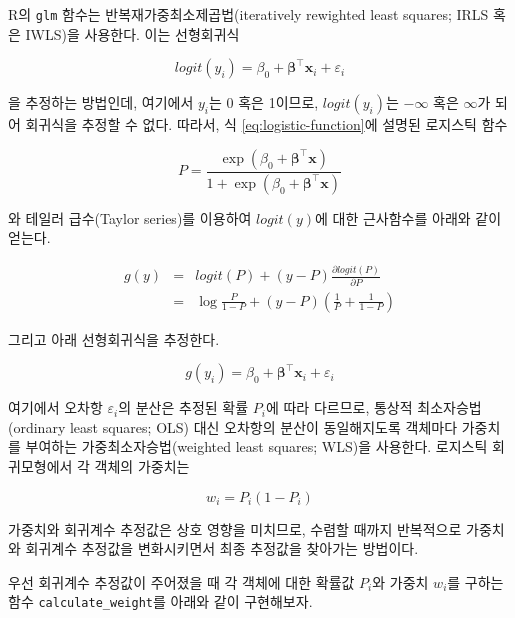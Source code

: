 \documentclass[]{book}
\begin{document}
R의 \texttt{glm} 함수는 반복재가중최소제곱법(iteratively rewighted least squares; IRLS 혹은 IWLS)을 사용한다. 이는 선형회귀식

\begin{equation*}
logit(y_i) = \beta_0 + \boldsymbol\beta^\top \mathbf{x}_i + \varepsilon_i
\end{equation*}

을 추정하는 방법인데, 여기에서 \(y_i\)는 0 혹은 1이므로, \(logit(y_i)\)는 \(-\infty\) 혹은 \(\infty\)가 되어 회귀식을 추정할 수 없다. 따라서, 식 \eqref{eq:logistic-function}에 설명된 로지스틱 함수

\begin{equation*}
P = \frac{\exp(\beta_0 + \boldsymbol\beta^\top \mathbf{x})}{1 + \exp(\beta_0 + \boldsymbol\beta^\top \mathbf{x})}
\end{equation*}

와 테일러 급수(Taylor series)를 이용하여 \(logit(y)\)에 대한 근사함수를 아래와 같이 얻는다.

\begin{eqnarray*}
g(y) &=& logit(P) + (y - P) \frac{\partial logit(P)}{\partial P}\\
&=& \log \frac{P}{1 - P} + (y - P) \left( \frac{1}{P} + \frac{1}{1 - P} \right)
\end{eqnarray*}

그리고 아래 선형회귀식을 추정한다.

\begin{equation*}
g(y_i) = \beta_0 + \boldsymbol\beta^\top \mathbf{x}_i + \varepsilon_i
\end{equation*}

여기에서 오차항 \(\varepsilon_i\)의 분산은 추정된 확률 \(P_i\)에 따라 다르므로, 통상적 최소자승법(ordinary least squares; OLS) 대신 오차항의 분산이 동일해지도록 객체마다 가중치를 부여하는 가중최소자승법(weighted least squares; WLS)을 사용한다. 로지스틱 회귀모형에서 각 객체의 가중치는

\begin{equation*}
w_i = P_i (1 - P_i)
\end{equation*}

가중치와 회귀계수 추정값은 상호 영향을 미치므로, 수렴할 때까지 반복적으로 가중치와 회귀계수 추정값을 변화시키면서 최종 추정값을 찾아가는 방법이다.

우선 회귀계수 추정값이 주어졌을 때 각 객체에 대한 확률값 \(P_i\)와 가중치 \(w_i\)를 구하는 함수 \texttt{calculate\_weight}를 아래와 같이 구현해보자.
\end{document}
